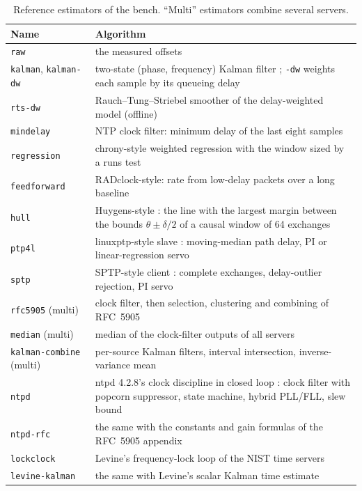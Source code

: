 \documentclass[11pt,a4paper]{article}
\begin{document}
\begin{table}[t]
\centering\small
\caption{Reference estimators of the bench. ``Multi'' estimators combine several servers.}\label{tab:estimators}
\begin{tabularx}{\linewidth}{@{}lX@{}}
\toprule
Name & Algorithm \\
\midrule
\texttt{raw} & the measured offsets \\
\texttt{kalman}, \texttt{kalman-dw} & two-state (phase, frequency) Kalman filter \citep{kalman1960}; \texttt{-dw} weights each sample by its queueing delay \\
\texttt{rts-dw} & Rauch--Tung--Striebel smoother \citep{rauch1965} of the delay-weighted model (offline) \\
\texttt{mindelay} & NTP clock filter: minimum delay of the last eight samples \citep{rfc5905} \\
\texttt{regression} & chrony-style weighted regression with the window sized by a runs test \citep{chrony} \\
\texttt{feedforward} & RADclock-style: rate from low-delay packets over a long baseline \citep{veitch2009} \\
\texttt{hull} & Huygens-style \citep{geng2018}: the line with the largest margin between the bounds $\theta \pm \delta/2$ of a causal window of 64 exchanges \\
\texttt{ptp4l} & linuxptp-style slave \citep{linuxptp}: moving-median path delay, PI or linear-regression servo \\
\texttt{sptp} & SPTP-style client \citep{fbsptp2024}: complete exchanges, delay-outlier rejection, PI servo \\
\texttt{rfc5905} (multi) & clock filter, then selection, clustering and combining of RFC~5905 \citep{rfc5905,marzullo1985} \\
\texttt{median} (multi) & median of the clock-filter outputs of all servers \\
\texttt{kalman-combine} (multi) & per-source Kalman filters, interval intersection, inverse-variance mean \\
\texttt{ntpd} & ntpd 4.2.8's clock discipline in closed loop \citep{ntploopfilter,ntpproto}: clock filter with popcorn suppressor, state machine, hybrid PLL/FLL, slew bound \\
\texttt{ntpd-rfc} & the same with the constants and gain formulas of the RFC~5905 appendix \citep{rfc5905} \\
\texttt{lockclock} & Levine's frequency-lock loop of the NIST time servers \citep{levine2020} \\
\texttt{levine-kalman} & the same with Levine's scalar Kalman time estimate \citep{levine2011kalman} \\
\bottomrule
\end{tabularx}
\end{table}
\end{document}

